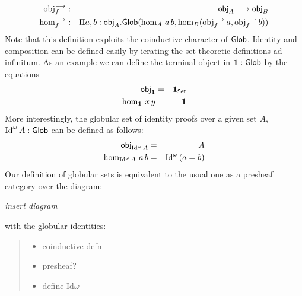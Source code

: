 \begin{eqnarray*}
  \mathrm{obj}^{\longrightarrow}_f & : & \mathsf{obj}_A \longrightarrow \mathsf{obj}_B \\
  \mathrm{hom}^{\longrightarrow}_f & : & \Pi a,b:\mathsf{obj}_A. \mathsf{Glob}(\hom_A\,a\,b,\hom_B(\mathrm{obj}^{\longrightarrow}_f\,a,\mathrm{obj}^{\longrightarrow}_f\,b))
\end{eqnarray*}
Note that this definition exploits the coinductive character of
$\mathsf{Glob}$. Identity and composition can be defined easily by ierating
the set-theoretic definitions ad infinitum. As an example we can
define the terminal object in $\mathbf{1} : \mathsf{Glob}$ by the equations
\begin{eqnarray*}
  \mathsf{obj}_{\mathbf{1}} & = & \mathbf{1}_{\mathsf{Set}} \\
  \hom_{\mathbf{1}}\,x\,y & = & \mathbf{1}
\end{eqnarray*}
More interestingly, the globular set of identity proofs over a given
set $A$, $\mathrm{Id}^\omega\,A : \mathsf{Glob}$ can be defined as follows:
\begin{eqnarray*}
\mathsf{obj}_{\mathrm{Id}^\omega\,A} & = & A \\
\hom_{\mathrm{Id}^\omega\,A}\,a\,b & = & \mathrm{Id}^\omega\,(a = b)
\end{eqnarray*}
Our definition of globular sets is equivalent to the usual one as a
presheaf category over the diagram:

\emph{insert diagram}

with the globular identities:



\begin{quote}
  \begin{itemize}\item coinductive defn
  \item presheaf?
  \item define Id$\omega$
  \end{itemize}
\end{quote}
 
